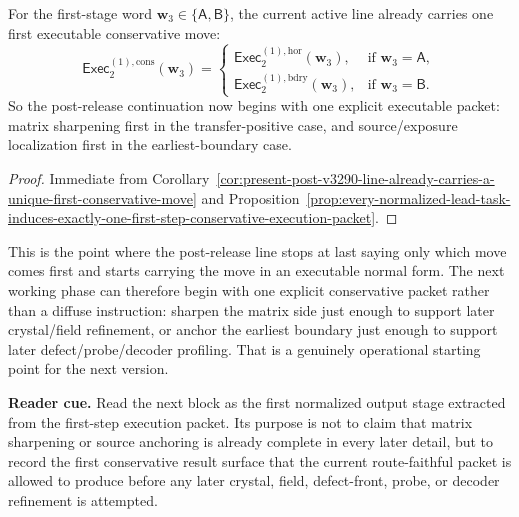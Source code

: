 \begin{corollary}
\label{cor:present-post-v3290-line-already-carries-a-first-executable-conservative-move}
For the first-stage word \(\mathbf w_3\in\{\mathsf A,\mathsf B\}\), the current active line already carries one first executable conservative move:
\[
  \mathsf{Exec}^{(1),\mathrm{cons}}_{2}(\mathbf w_3)
  =
  \begin{cases}
    \mathsf{Exec}^{(1),\mathrm{hor}}_{2}(\mathbf w_3), & \text{if }\mathbf w_3=\mathsf A,\\[2mm]
    \mathsf{Exec}^{(1),\mathrm{bdry}}_{2}(\mathbf w_3), & \text{if }\mathbf w_3=\mathsf B.
  \end{cases}
\]
So the post-release continuation now begins with one explicit executable packet: matrix sharpening first in the transfer-positive case, and source/exposure localization first in the earliest-boundary case.
\end{corollary}

\begin{proof}
Immediate from Corollary~\ref{cor:present-post-v3290-line-already-carries-a-unique-first-conservative-move} and Proposition~\ref{prop:every-normalized-lead-task-induces-exactly-one-first-step-conservative-execution-packet}.
\end{proof}

\begin{remark}
\label{rem:what-this-first-executable-packet-now-buys}
This is the point where the post-release line stops at last saying only which move comes first and starts carrying the move in an executable normal form. The next working phase can therefore begin with one explicit conservative packet rather than a diffuse instruction: sharpen the matrix side just enough to support later crystal/field refinement, or anchor the earliest boundary just enough to support later defect/probe/decoder profiling. That is a genuinely operational starting point for the next version.
\end{remark}


\noindent\textbf{Reader cue.} Read the next block as the first normalized output stage extracted from the first-step execution packet. Its purpose is not to claim that matrix sharpening or source anchoring is already complete in every later detail, but to record the first conservative result surface that the current route-faithful packet is allowed to produce before any later crystal, field, defect-front, probe, or decoder refinement is attempted.

